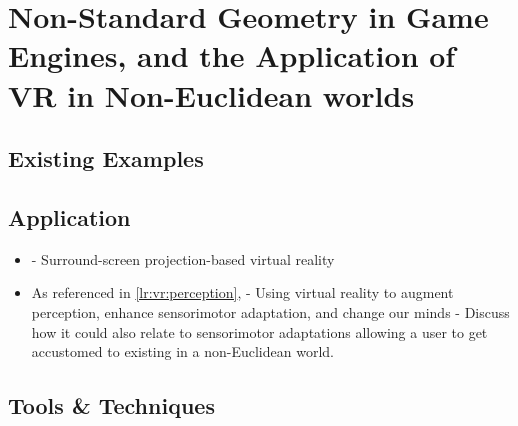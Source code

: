 \section[Non-Standard Geometry in Game Engines, and VR Applications]{Non-Standard Geometry in Game Engines, and the Application of VR in Non-Euclidean worlds}
\label{lr:cross}



	\subsection{Existing Examples}
	\label{lr:ne:existing}


	\subsection{Application}
	\label{lr:cross:application}

		\begin{itemize}
			\item \cite{Cruz-Neira1993} - Surround-screen projection-based virtual reality
			\item As referenced in \ref{lr:vr:perception}, \cite{Wright2014} - Using virtual reality to augment perception, enhance sensorimotor adaptation, and change our minds - Discuss how it could also relate to sensorimotor adaptations allowing a user to get accustomed to existing i\textsl{}n a non-Euclidean world.
		\end{itemize}
	
	\subsection{Tools \& Techniques}
	\label{lr:cross:tools}

